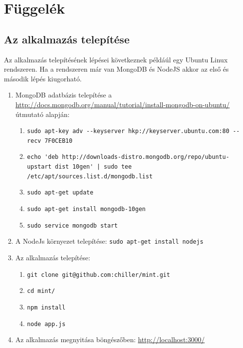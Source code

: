 \appendix
\chapter*{Függelék}
\setcounter{chapter}{6}  %
\setcounter{equation}{0} %

\section{Az alkalmazás telepítése}

Az alkalmazás telepítésének lépései következnek példáúl egy Ubuntu Linux rendszeren. Ha a rendszeren már van MongoDB és NodeJS akkor az első és második lépés kiugorható.

\begin{enumerate}
\item MongoDB adatbázis telepítése a \url{http://docs.mongodb.org/manual/tutorial/install-mongodb-on-ubuntu/} útmutató alapján:
\begin{enumerate}
\item \lstinline{sudo apt-key adv --keyserver hkp://keyserver.ubuntu.com:80 --recv 7F0CEB10}
\item \lstinline{echo 'deb http://downloads-distro.mongodb.org/repo/ubuntu-upstart dist 10gen' | sudo tee /etc/apt/sources.list.d/mongodb.list}
\item \lstinline{sudo apt-get update}
\item \lstinline{sudo apt-get install mongodb-10gen}
\item \lstinline{sudo service mongodb start}
\end{enumerate}

\item A NodeJs környezet telepítése: \lstinline{sudo apt-get install nodejs}
\item Az alkalmazás telepítése:
\begin{enumerate}
\item \lstinline{git clone git@github.com:chiller/mint.git}
\item \lstinline{cd mint/}
\item \lstinline{npm install}
\item \lstinline{node app.js}
\end{enumerate}
\item Az alkalmazás megnyitása böngészőben: \url{http://localhost:3000/}
\end{enumerate}

